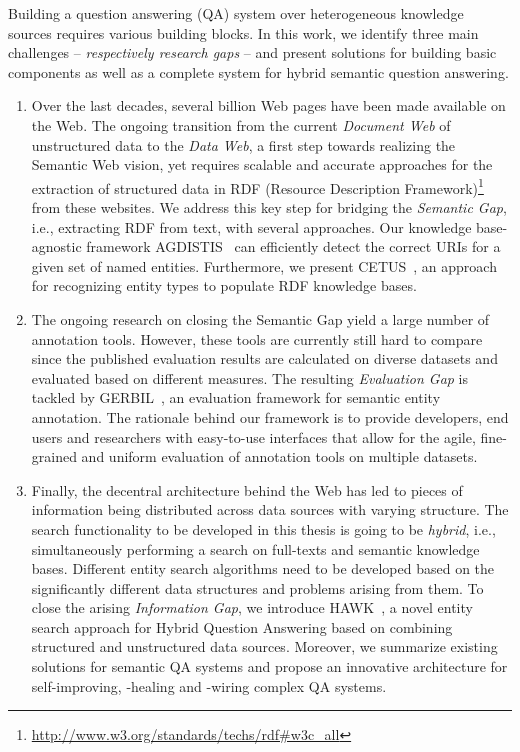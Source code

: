 Building a question answering (QA) system over heterogeneous knowledge sources requires various building blocks.
In this work, we identify three main challenges -- \emph{respectively research gaps} -- and present solutions for building basic components as well as a complete system for hybrid semantic question answering.
\begin{enumerate}
\item 
Over the last decades, several billion Web pages have been made available on the Web. 
The ongoing transition from the current \emph{Document Web} of unstructured data to the \emph{Data Web}, a first step towards realizing the Semantic Web vision, yet requires scalable and accurate approaches for the extraction of structured data in RDF (Resource Description Framework)\footnote{\url{http://www.w3.org/standards/techs/rdf\#w3c_all}} from these websites.
We address this key step for bridging the \emph{Semantic Gap}, i.e., extracting RDF from text,  with several approaches.
Our knowledge base-agnostic framework AGDISTIS~\cite{agdistis_iswc} can efficiently detect the correct URIs for a given set of named entities.
Furthermore, we present CETUS~\cite{CETUS_2015}, an approach for recognizing entity types to populate RDF knowledge bases. 
\item 
The ongoing research on closing the Semantic Gap yield a large number of annotation tools.
However, these tools are currently still hard to compare since the published evaluation results are calculated on diverse datasets and evaluated based on different measures.
The resulting \emph{Evaluation Gap} is tackled by GERBIL~\cite{gerbil}, an evaluation framework for semantic entity annotation. The rationale behind our framework is to provide developers, end users and researchers with easy-to-use interfaces that allow for the agile, fine-grained and uniform evaluation of annotation tools on multiple datasets.
\item 
Finally, the decentral architecture behind the Web has led to pieces of information being distributed across data sources with varying structure. 
The search functionality to be developed in this thesis is going to be \emph{hybrid}, i.e., simultaneously performing a search on full-texts and semantic knowledge bases.
Different entity search algorithms need to be developed based on the significantly different data structures and problems arising from them. 
To close the arising \emph{Information Gap}, we introduce HAWK~\cite{hawk_2015}, a novel entity search approach for Hybrid Question Answering based on combining structured and unstructured data sources.
Moreover, we summarize existing solutions for semantic QA systems and propose an innovative architecture for self-improving, -healing and -wiring complex QA systems.
\end{enumerate}

